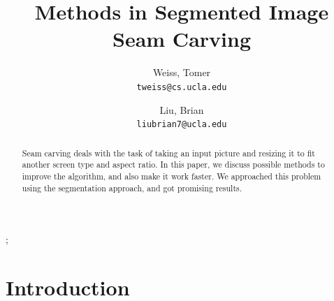 \documentclass[conference]{acmsiggraph}
\title{Methods in Segmented Image Seam Carving}
\author{
  Weiss, Tomer\\
  \texttt{tweiss@cs.ucla.edu}
  \and
  Liu, Brian\\
  \texttt{liubrian7@ucla.edu}
}
\begin{document}

\maketitle

\begin{abstract}

Seam carving deals with the task of taking an input picture and resizing it to fit another screen type and aspect ratio. In this paper, we discuss possible methods to improve the algorithm, and also make it work faster. We approached this problem using the segmentation approach, and got promising results.



\end{abstract}

\begin{CRcatlist}  

  
  ;     
  
\end{CRcatlist}

\keywordlist


\TOGlinkslist


\copyrightspace

\section{Introduction}
\end{document}
